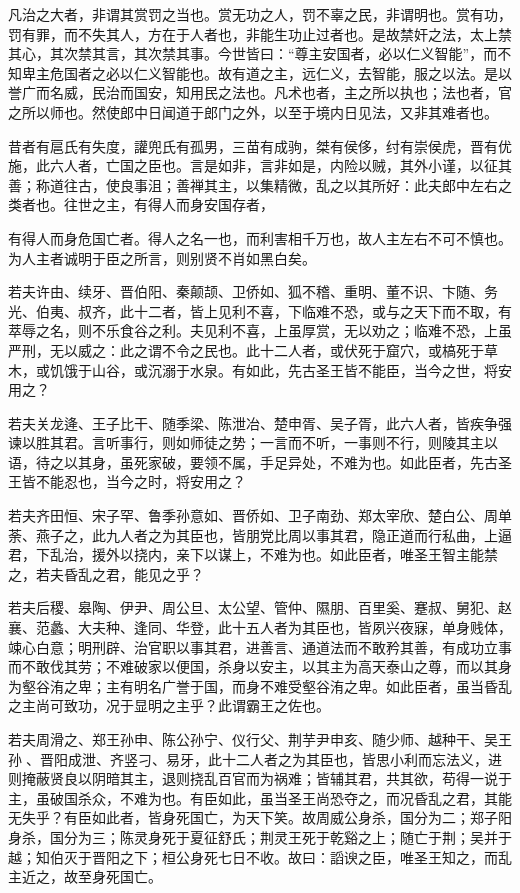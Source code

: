 \documentclass[]{article}
\begin{document}
凡治之大者，非谓其赏罚之当也。赏无功之人，罚不辜之民，非谓明也。赏有功，罚有罪，而不失其人，方在于人者也，非能生功止过者也。是故禁奸之法，太上禁其心，其次禁其言，其次禁其事。今世皆曰：``尊主安国者，必以仁义智能''，而不知卑主危国者之必以仁义智能也。故有道之主，远仁义，去智能，服之以法。是以誉广而名威，民治而国安，知用民之法也。凡术也者，主之所以执也；法也者，官之所以师也。然使郎中日闻道于郎门之外，以至于境内日见法，又非其难者也。

昔者有扈氏有失度，讙兜氏有孤男，三苗有成驹，桀有侯侈，纣有崇侯虎，晋有优施，此六人者，亡国之臣也。言是如非，言非如是，内险以贼，其外小谨，以征其善；称道往古，使良事沮；善禅其主，以集精微，乱之以其所好：此夫郎中左右之类者也。往世之主，有得人而身安国存者，

有得人而身危国亡者。得人之名一也，而利害相千万也，故人主左右不可不慎也。为人主者诚明于臣之所言，则别贤不肖如黑白矣。

若夫许由、续牙、晋伯阳、秦颠颉、卫侨如、狐不稽、重明、董不识、卞随、务光、伯夷、叔齐，此十二者，皆上见利不喜，下临难不恐，或与之天下而不取，有萃辱之名，则不乐食谷之利。夫见利不喜，上虽厚赏，无以劝之；临难不恐，上虽严刑，无以威之：此之谓不令之民也。此十二人者，或伏死于窟穴，或槁死于草木，或饥饿于山谷，或沉溺于水泉。有如此，先古圣王皆不能臣，当今之世，将安用之？

若夫关龙逄、王子比干、随季梁、陈泄冶、楚申胥、吴子胥，此六人者，皆疾争强谏以胜其君。言听事行，则如师徒之势；一言而不听，一事则不行，则陵其主以语，待之以其身，虽死家破，要领不属，手足异处，不难为也。如此臣者，先古圣王皆不能忍也，当今之时，将安用之？

若夫齐田恒、宋子罕、鲁季孙意如、晋侨如、卫子南劲、郑太宰欣、楚白公、周单荼、燕子之，此九人者之为其臣也，皆朋党比周以事其君，隐正道而行私曲，上逼君，下乱治，援外以挠内，亲下以谋上，不难为也。如此臣者，唯圣王智主能禁之，若夫昏乱之君，能见之乎？

若夫后稷、皋陶、伊尹、周公旦、太公望、管仲、隰朋、百里奚、蹇叔、舅犯、赵襄、范蠡、大夫种、逢同、华登，此十五人者为其臣也，皆夙兴夜寐，单身贱体，竦心白意；明刑辟、治官职以事其君，进善言、通道法而不敢矜其善，有成功立事而不敢伐其劳；不难破家以便国，杀身以安主，以其主为高天泰山之尊，而以其身为壑谷洧之卑；主有明名广誉于国，而身不难受壑谷洧之卑。如此臣者，虽当昏乱之主尚可致功，况于显明之主乎？此谓霸王之佐也。

若夫周滑之、郑王孙申、陈公孙宁、仪行父、荆芋尹申亥、随少师、越种干、吴王孙、晋阳成泄、齐竖刁、易牙，此十二人者之为其臣也，皆思小利而忘法义，进则掩蔽贤良以阴暗其主，退则挠乱百官而为祸难；皆辅其君，共其欲，苟得一说于主，虽破国杀众，不难为也。有臣如此，虽当圣王尚恐夺之，而况昏乱之君，其能无失乎？有臣如此者，皆身死国亡，为天下笑。故周威公身杀，国分为二；郑子阳身杀，国分为三；陈灵身死于夏征舒氏；荆灵王死于乾谿之上；随亡于荆；吴并于越；知伯灭于晋阳之下；桓公身死七日不收。故曰：謟谀之臣，唯圣王知之，而乱主近之，故至身死国亡。
\end{document}
